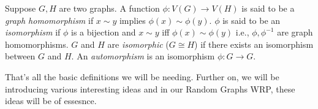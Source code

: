 \begin{defn} 
    Suppose $G,H$ are two graphs. A function $\phi : V(G) \to V(H)$ is said to be a {\em graph homomorphism} if $x \sim y$ implies $\phi(x) \sim \phi(y).$ $\phi$ is said to be an {\em isomorphism} if $\phi$ is a bijection and $x \sim y$ iff $\phi(x) \sim \phi(y)$ i.e., $\phi, \phi^{-1}$ are graph homomorphisms. $G$ and $H$ are {\em isomorphic} ($G \cong H$) if there exists an isomorphism between $G$ and $H$. An {\em  automorphism} is an isomorphism $\phi :G \to G$.
\end{defn}

That's all the basic definitions we will be needing. Further on, we will be introducing various interesting ideas and in our Random Graphs WRP, these ideas will be of essesnce.
